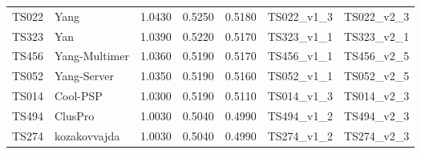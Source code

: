 \begin{table}[ht]
{\begin{tabular}{llrrrll}
TS022 & Yang & 1.0430 & 0.5250 & 0.5180 & TS022\_v1\_3 & TS022\_v2\_3 \\ 
TS323 & Yan & 1.0390 & 0.5220 & 0.5170 & TS323\_v1\_1 & TS323\_v2\_1 \\ 
TS456 & Yang-Multimer & 1.0360 & 0.5190 & 0.5170 & TS456\_v1\_1 & TS456\_v2\_5 \\ 
TS052 & Yang-Server & 1.0350 & 0.5190 & 0.5160 & TS052\_v1\_1 & TS052\_v2\_5 \\ 
TS014 & Cool-PSP & 1.0300 & 0.5190 & 0.5110 & TS014\_v1\_3 & TS014\_v2\_3 \\ 
TS494 & ClusPro & 1.0030 & 0.5040 & 0.4990 & TS494\_v1\_2 & TS494\_v2\_3 \\ 
TS274 & kozakovvajda & 1.0030 & 0.5040 & 0.4990 & TS274\_v1\_2 & TS274\_v2\_3 \\ 
\bottomrule
\end{tabular}%
}
\end{table}
